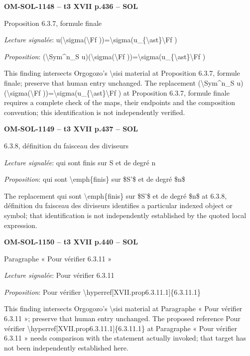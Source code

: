 \par\noindent\textbf{OM-SOL-1148 -- t3 XVII p.436 -- SOL}\par
Proposition 6.3.7, formule finale\par
\emph{Lecture signalée}: u(\textbackslash{}sigma(\textbackslash{}Ff ))=\allowbreak \textbackslash{}sigma(u\_\{\textbackslash{}ast\}\textbackslash{}Ff )\par
\emph{Proposition}: (\textbackslash{}Sym\textasciicircum{}n\_S u)(\textbackslash{}sigma(\textbackslash{}Ff ))=\allowbreak \textbackslash{}sigma(u\_\{\textbackslash{}ast\}\textbackslash{}Ff )\par
This finding intersects Orgogozo's \textbackslash{}sisi material at Proposition 6.3.7, formule finale; preserve that human entry unchanged. The replacement (\textbackslash{}Sym\textasciicircum{}n\_S u)(\textbackslash{}sigma(\textbackslash{}Ff ))=\allowbreak \textbackslash{}sigma(u\_\{\textbackslash{}ast\}\textbackslash{}Ff ) at Proposition 6.3.7, formule finale requires a complete check of the maps, their endpoints and the composition convention; this identification is not independently verified.\par
\par\noindent\textbf{OM-SOL-1149 -- t3 XVII p.437 -- SOL}\par
6.3.8, définition du faisceau des diviseurs\par
\emph{Lecture signalée}: qui sont finis sur S et de degré n\par
\emph{Proposition}: qui sont \textbackslash{}emph\{finis\} sur \$S'\$ et de degré \$n\$\par
The replacement qui sont \textbackslash{}emph\{finis\} sur \$S'\$ et de degré \$n\$ at 6.3.8, définition du faisceau des diviseurs identifies a particular indexed object or symbol; that identification is not independently established by the quoted local expression.\par
\par\noindent\textbf{OM-SOL-1150 -- t3 XVII p.440 -- SOL}\par
Paragraphe « Pour vérifier 6.3.11 »\par
\emph{Lecture signalée}: Pour vérifier 6.3.11\par
\emph{Proposition}: Pour vérifier \textbackslash{}hyperref[XVII.prop6.3.11.1]\{6.3.11.1\}\par
This finding intersects Orgogozo's \textbackslash{}sisi material at Paragraphe « Pour vérifier 6.3.11 »; preserve that human entry unchanged. The proposed reference Pour vérifier \textbackslash{}hyperref[XVII.prop6.3.11.1]\{6.3.11.1\} at Paragraphe « Pour vérifier 6.3.11 » needs comparison with the statement actually invoked; that target has not been independently established here.\par

